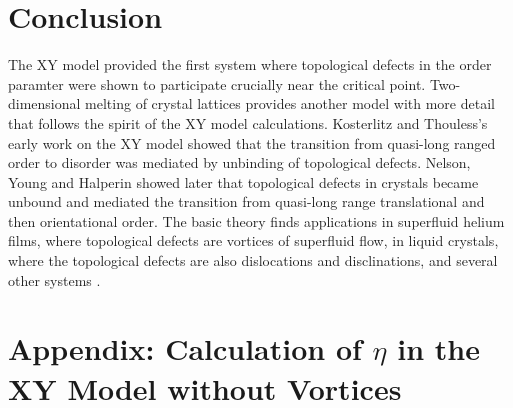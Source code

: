 \documentclass[a4paper,10pt]{article}
\begin{document}
\section{Conclusion}
The XY model provided the first system where topological defects in the order 
paramter were shown to participate crucially near the critical point. 
Two-dimensional melting of crystal lattices provides another model with more 
detail that follows the spirit of the XY model calculations. Kosterlitz and 
Thouless's early work on the XY model showed that the transition from quasi-long 
ranged order to disorder was mediated by unbinding of topological defects. 
Nelson, Young and Halperin showed later that topological defects in crystals 
became unbound and mediated the transition from quasi-long range 
translational and then orientational order. The basic theory finds applications 
in superfluid helium films, where topological defects are vortices of 
superfluid flow, in liquid crystals, where the topological defects are also 
dislocations and disclinations, and several other systems \cite{Chaikin}.


\section{Appendix: Calculation of $\eta$ in the XY Model without Vortices}
\end{document}
